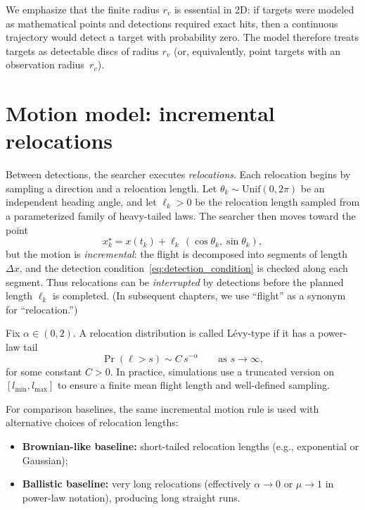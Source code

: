 We emphasize that the finite radius $r_v$ is essential in 2D: if targets were modeled as mathematical points and detections required exact hits, then a continuous trajectory would detect a target with probability zero. The model therefore treats targets as detectable discs of radius $r_v$ (or, equivalently, point targets with an observation radius~$r_v$).

\section{Motion model: incremental relocations}
Between detections, the searcher executes \emph{relocations}. Each relocation begins by sampling a direction and a relocation length. Let $\theta_k \sim \mathrm{Unif}(0,2\pi)$ be an independent heading angle, and let $\ell_k>0$ be the relocation length sampled from a parameterized family of heavy-tailed laws. The searcher then moves toward the point
\begin{equation}
    x_k^{\star} = x(t_k) + \ell_k \, (\cos\theta_k,\sin\theta_k),
    \label{eq:relocation_target_point}
\end{equation}
but the motion is \emph{incremental}: the flight is decomposed into segments of length~$\Delta x$, and the detection condition~\eqref{eq:detection_condition} is checked along each segment.  Thus relocations can be \emph{interrupted} by detections before the planned length $\ell_k$ is completed.  (In subsequent chapters, we use ``flight'' as a synonym for ``relocation.'')

\begin{Def}
Fix $\alpha\in(0,2)$. A relocation distribution is called L\'evy-type if it has a power-law tail
\begin{equation}
    \Pr(\ell > s)\sim C\, s^{-\alpha}\qquad \text{as } s\to\infty,
    \label{eq:levy_tail}
\end{equation}
for some constant $C>0$. In practice, simulations use a truncated version on $[l_{\min}, l_{\max}]$ to ensure a finite mean flight length and well-defined sampling.
\end{Def}

For comparison baselines, the same incremental motion rule is used with alternative choices of relocation lengths:
\begin{itemize}
    \item \textbf{Brownian-like baseline:} short-tailed relocation lengths (e.g., exponential or Gaussian);
    \item \textbf{Ballistic baseline:} very long relocations (effectively $\alpha\to 0$ or $\mu\to 1$ in power-law notation), producing long straight runs.
\end{itemize}

